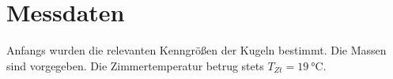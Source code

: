 \section{Messdaten}

Anfangs wurden die relevanten Kenngrößen der Kugeln bestimmt.
Die Massen sind vorgegeben.
Die Zimmertemperatur betrug stets $T_{Zt}=\qty[]{19}{\degreeCelsius}$.










